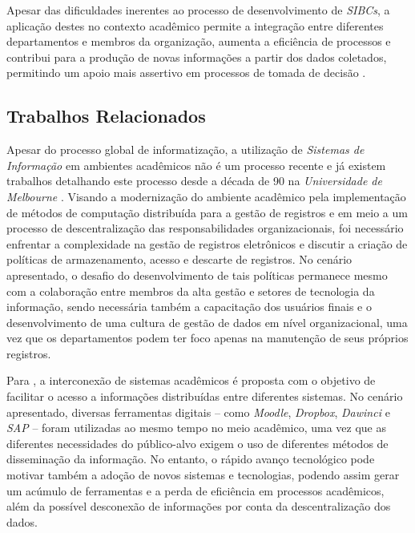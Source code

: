 \documentclass[nonacm, sigconf]{acmart}
\begin{document}
Apesar das dificuldades inerentes ao processo de desenvolvimento de \textit{SIBCs}, a aplicação destes no contexto acadêmico permite a integração entre diferentes departamentos e membros da organização, aumenta a eficiência de processos e contribui para a produção de novas informações a partir dos dados coletados, permitindo um apoio mais assertivo em processos de tomada de decisão \cite{katarina2015}.

\subsection{Trabalhos Relacionados}
\label{section:related-works}

Apesar do processo global de informatização, a utilização de \textit{Sistemas de Informação} em ambientes acadêmicos não é um processo recente e já existem trabalhos detalhando este processo desde a década de 90 na \textit{Universidade de Melbourne} \cite{Davidson_Moscato_1994}. Visando a modernização do ambiente acadêmico pela implementação de métodos de computação distribuída para a gestão de registros e em meio a um processo de descentralização das responsabilidades organizacionais, foi necessário enfrentar a complexidade na gestão de registros eletrônicos e discutir a criação de políticas de armazenamento, acesso e descarte de registros. No cenário apresentado, o desafio do desenvolvimento de tais políticas permanece mesmo com a colaboração entre membros da alta gestão e setores de tecnologia da informação, sendo necessária também a capacitação dos usuários finais e o desenvolvimento de uma cultura de gestão de dados em nível organizacional, uma vez que os departamentos podem ter foco apenas na manutenção de seus próprios registros.

Para \cite{katarina2015}, a interconexão de sistemas acadêmicos é proposta com o objetivo de facilitar o acesso a informações distribuídas entre diferentes sistemas. No cenário apresentado, diversas ferramentas digitais -- como \textit{Moodle}, \textit{Dropbox}, \textit{Dawinci} e \textit{SAP} -- foram utilizadas ao mesmo tempo no meio acadêmico, uma vez que as diferentes necessidades do público-alvo exigem o uso de diferentes métodos de disseminação da informação. No entanto, o rápido avanço tecnológico pode motivar também a adoção de novos sistemas e tecnologias, podendo assim gerar um acúmulo de ferramentas e a perda de eficiência em processos acadêmicos, além da possível desconexão de informações por conta da descentralização dos dados.
\end{document}

